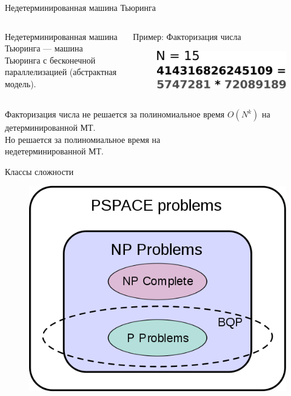 \documentclass[10pt]{beamer}
\begin{document}
\begin{frame}{Недетерминированная машина Тьюринга}
\begin{columns}
\begin{column}{.48\linewidth}
Недетерминированная машина Тьюринга — машина Тьюринга с бесконечной параллелизацией (абстрактная модель).
\end{column}
\begin{column}{.48\linewidth}
Пример: Факторизация числа
		\begin{figure}
		\centerline{\includegraphics[width=1.0\linewidth]{images/factorization.png}}
		\end{figure}
	\end{column}
	\end{columns}

\begin{alertblock}{}
Факторизация числа не решается за полиномиальное время $O(N^k)$ на детерминированной МТ.\\
Но решается за полиномиальное время на \\
недетерминированной МТ.
\end{alertblock}

\end{frame}



\begin{frame}{Классы сложности}
\begin{figure}
\centerline{\includegraphics[width=0.75\linewidth]{images/complexities.png}}
\end{figure}
\end{frame}
\end{document}
